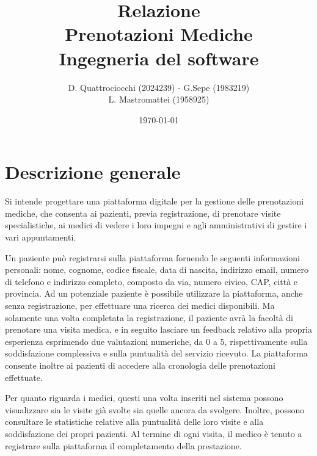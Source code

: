 \documentclass[12pt]{report}
\begin{document}
    \renewcommand{\labelenumii}{\arabic{enumi}.\arabic{enumii}}
    \renewcommand{\labelenumiii}{\arabic{enumi}.\arabic{enumii}.\arabic{enumiii}}
    \renewcommand{\labelenumiv}{\arabic{enumi}.\arabic{enumii}.\arabic{enumiii}.\arabic{enumiv}}

    \title{Relazione \\Prenotazioni Mediche\\Ingegneria del software}
    \author{D. Quattrociocchi (2024239) - G.Sepe (1983219)\\L. Mastromattei (1958925)}
    \date{\today}
    
    \maketitle
    \tableofcontents
    \newpage
        
    
    \chapter{Descrizione generale}
    
   Si intende progettare una piattaforma digitale per la gestione delle prenotazioni mediche, che consenta ai pazienti, previa registrazione, di prenotare visite specialistiche, ai medici di vedere i loro impegni e agli amministrativi di gestire i vari appuntamenti.

Un paziente può registrarsi sulla piattaforma fornendo le seguenti informazioni personali: nome, cognome, codice fiscale, data di nascita, indirizzo email, numero di telefono e indirizzo completo, composto da via, numero civico, CAP, città e provincia. Ad un potenziale paziente è possibile utilizzare la piattaforma, anche senza registrazione, per effettuare una ricerca dei medici disponibili. Ma solamente una volta completata la registrazione, il paziente avrà la facoltà di prenotare una visita medica, e in seguito lasciare un feedback relativo alla propria esperienza esprimendo due valutazioni numeriche, da 0 a 5, rispettivamente sulla soddisfazione complessiva e sulla puntualità del servizio ricevuto. La piattaforma consente inoltre ai pazienti di accedere alla cronologia delle prenotazioni effettuate.

Per quanto riguarda i medici, questi una volta inseriti nel sistema possono visualizzare sia le visite già svolte sia quelle ancora da svolgere. Inoltre, possono consultare le statistiche relative alla puntualità delle loro visite e alla soddisfazione dei propri pazienti. Al termine di ogni visita, il medico è tenuto a registrare sulla piattaforma il completamento della prestazione.
\end{document}
